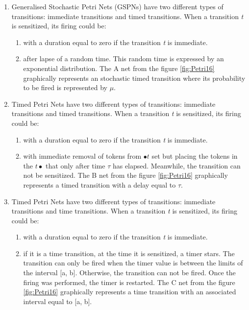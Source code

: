 	
	\begin{enumerate}
	  	\item Generalised Stochastic Petri Nets (GSPNs) \cite{gspn} have two different types of 
	  		transitions: immediate transitions and timed transitions. When a transition \emph{t} is
	  		sensitized, its firing could be:
			\begin{enumerate}
			  	\item with a duration equal to zero if the transition \emph{t} is immediate.
			  	\item after lapse of a random time. This random time is expressed by an exponential 
			  	distribution. The A net from the figure \ref{fig:Petri16} graphically represents an stochastic
			  	timed transition where its probability to be fired is represented by $\mu$.
			\end{enumerate}
		\item Timed Petri Nets have two different types of transitions: immediate transitions and timed
			transitions. When a transition \emph{t} is sensitized, its firing could be:
			\begin{enumerate}
			  	\item with a duration equal to zero if the transition \emph{t} is immediate.
			  	\item with immediate removal of tokens from $\bullet t$ set but placing the tokens in 
			  	the $t \bullet$ that only after time $\tau$ has elapsed. Meanwhile, the transition 
			  	can not be sensitized. The B net from the figure \ref{fig:Petri16} graphically represents 
			  	a timed transition with a delay equal to $\tau$.
			\end{enumerate}
		\item Timed Petri Nets have two different types of transitions: immediate transitions and time
			transitions. When a transition \emph{t} is sensitized, its firing could be:
			\begin{enumerate}
			  	\item with a duration equal to zero if the transition \emph{t} is immediate.
			  	\item if it is a time transition, at the time it is sensitized, a timer stars. The transition
			  	can only be fired when the timer value is between the limits of the interval [a, b].
			  	Otherwise, the transition can not be fired. Once the firing was performed, the timer is
			  	restarted. The C net from the figure \ref{fig:Petri16} graphically represents  a time transition
			  	with an associated interval equal to [a, b].
			\end{enumerate}		
	\end{enumerate}
	
